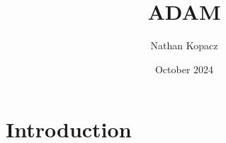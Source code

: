 \documentclass{article}
\title{ADAM}
\author{Nathan Kopacz}
\date{October 2024}
\begin{document}
\maketitle

\section{Introduction}
\end{document}
